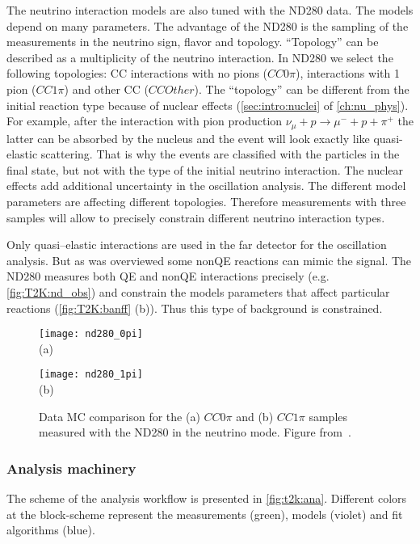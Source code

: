 \documentclass[../main.tex]{subfiles}
\begin{document}
The neutrino interaction models are also tuned with the ND280 data. The models depend on many parameters. The advantage of the ND280 is the sampling of the measurements in the neutrino sign, flavor and topology. ``Topology'' can be described as a multiplicity of the neutrino interaction. In ND280 we select the following topologies: CC interactions with no pions ($CC0\pi$), interactions with 1 pion ($CC1\pi$) and other CC ($CCOther$). The ``topology'' can be different from the initial reaction type because of nuclear effects (\autoref{sec:intro:nuclei} of \autoref{ch:nu_phys}). For example, after the interaction with pion production $\nu_\mu+p\to\mu^-+p+\pi^+$ the latter can be absorbed by the nucleus and the event will look exactly like quasi-elastic scattering. That is why the events are classified with the particles in the final state, but not with the type of the initial neutrino interaction. The nuclear effects add additional uncertainty in the oscillation analysis. The different model parameters are affecting different topologies. Therefore measurements with three samples will allow to precisely constrain different neutrino interaction types.

Only quasi--elastic interactions are used in the far detector for the oscillation analysis. But as was overviewed some nonQE reactions can mimic the signal. The ND280 measures both QE and nonQE interactions precisely (e.g. \autoref{fig:T2K:nd_obs}) and constrain the models parameters that affect particular reactions (\autoref{fig:T2K:banff} (b)). Thus this type of background is constrained.

\begin{figure}[!ht]
  \centering
  \begin{minipage}{0.49\linewidth}
    \centering
    \texttt{[image: nd280\_0pi]} \\ (a)
  \end{minipage}
  \begin{minipage}{0.49\linewidth}
    \centering
    \texttt{[image: nd280\_1pi]} \\ (b)
  \end{minipage}
    \caption{Data MC comparison for the (a) $CC0\pi$ and (b) $CC1\pi$ samples measured with the ND280 in the neutrino mode. Figure from~\cite{Abe2017}.}
    \label{fig:T2K:nd_obs}
\end{figure}

\subsubsection{Analysis machinery}
The scheme of the analysis workflow is presented in \autoref{fig:t2k:ana}. Different colors at the block-scheme represent the measurements (green), models (violet) and fit algorithms (blue).
\end{document}
